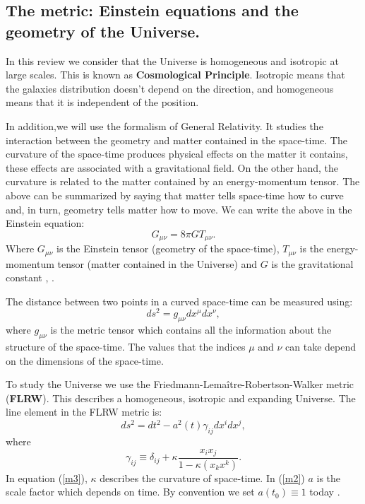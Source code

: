 \documentclass[onecolumn,           %
               showpacs,            %
               preprintnumbers,     %
               aps,                 %
               letterpaper,             %
               superscriptaddress,      %
               nofootinbib,         %
               tightenlines,        %
               floats,floatfix      %
               ,usenatbib,
               ]{revtex4-1}
\begin{document}
\subsection{The metric: Einstein equations and the geometry of the Universe.}
In this review we consider that the Universe is homogeneous and isotropic at large scales. This is known as \textbf{Cosmological Principle}. Isotropic means that the galaxies distribution doesn't depend on the direction, and homogeneous means that it is independent of the position. 

In addition,we will use the formalism of General Relativity. It studies the interaction between the geometry and matter contained in the space-time. The curvature of the space-time produces physical effects on the matter it contains, these effects are associated with a gravitational field. On the other hand, the curvature is related to the matter contained by an energy-momentum tensor. The above can be summarized by saying that matter tells space-time how to curve and, in turn, geometry tells matter how to move. We can write the above in the Einstein equation:
\begin{equation}
\label{einstein}
G_{\mu \nu} = 8\pi G T_{\mu \nu}.
\end{equation}
Where $G_{\mu \nu}$ is the Einstein tensor (geometry of the space-time), $T_{\mu \nu}$ is the energy-momentum tensor (matter contained in the Universe) and $G$ is the gravitational constant \cite{baumann}, \cite{wald}.

The distance between two points in a curved space-time can be measured using:
\begin{equation}
ds^2 = g_{\mu \nu}dx^{\mu}dx^{\nu},
\end{equation}
where $g_{\mu \nu}$ is the metric tensor which contains all the information about the structure of the space-time. The values that the indices $\mu$ and $\nu$ can take depend on the dimensions of the space-time.

To study the Universe we use the Friedmann-Lema\^itre-Robertson-Walker metric (\textbf{FLRW}). This describes a homogeneous, isotropic and expanding Universe. The line element in the FLRW metric is:
\begin{equation}
\label{m2}
ds^2 = dt^2 -a^2(t)\gamma_{ij}dx^idx^j ,
\end{equation}
where
\begin{equation}
\label{m3}
\gamma_{ij} \equiv \delta_{ij} + \kappa \frac{x_i x_j}{1 - \kappa \left(x_k x^k\right)}.
\end{equation}
In equation (\ref{m3}), $\kappa$ describes the curvature of space-time. In (\ref{m2}) $a$ is the scale factor which depends on time. By convention we set $a(t_0) \equiv 1$ today \cite{cambridge}.
\end{document}
